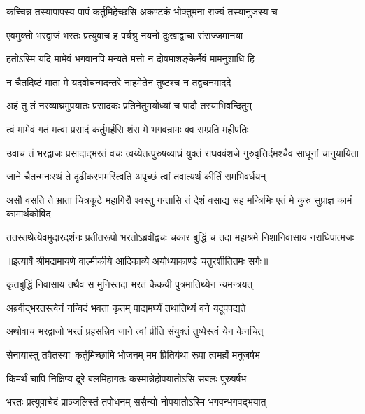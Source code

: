\twolineshloka
{कच्चिन्न तस्यापापस्य पापं कर्तुमिहेच्छसि}
{अकण्टकं भोक्तुमना राज्यं तस्यानुजस्य च} %

\twolineshloka
{एवमुक्तो भरद्वाजं भरतः प्रत्युवाच ह}
{पर्यश्रु नयनो दुःखाद्वाचा संसज्जमानया} %

\twolineshloka
{हतोऽस्मि यदि मामेवं भगवानपि मन्यते}
{मत्तो न दोषमाशङ्केर्नैवं मामनुशाधि हि} %

\twolineshloka
{न चैतदिष्टं माता मे यदवोचन्मदन्तरे}
{नाहमेतेन तुष्टश्च न तद्वचनमाददे} %

\twolineshloka
{अहं तु तं नरव्याघ्रमुपयातः प्रसादकः}
{प्रतिनेतुमयोध्यां च पादौ तस्याभिवन्दितुम्} %

\twolineshloka
{त्वं मामेवं गतं मत्वा प्रसादं कर्तुमर्हसि}
{शंस मे भगवन्रामः क्व सम्प्रति महीपतिः} %

\threelineshloka
{उवाच तं भरद्वाजः प्रसादाद्भरतं वचः}
{त्वय्येतत्पुरुषव्याघ्रं युक्तं राघववंशजे}
{गुरुवृत्तिर्दमश्चैव साधूनां चानुयायिता} %

\twolineshloka
{जाने चैतन्मनःस्थं ते दृढीकरणमस्त्विति}
{अपृच्छं त्वां तवात्यर्थं कीर्तिं समभिवर्धयन्} %

\threelineshloka
{असौ वसति ते भ्राता चित्रकूटे महागिरौ}
{श्वस्तु गन्तासि तं देशं वसाद्य सह मन्त्रिभिः}
{एतं मे कुरु सुप्राज्ञ कामं कामार्थकोविद} %

\fourlineindentedshloka
{ततस्तथेत्येवमुदारदर्शनः}
{प्रतीतरूपो भरतोऽब्रवीद्वचः}
{चकार बुद्धिं च तदा महाश्रमे}
{निशानिवासाय नराधिपात्मजः} %


{॥इत्यार्षे श्रीमद्रामायणे वाल्मीकीये आदिकाव्ये अयोध्याकाण्डे चतुरशीतितमः सर्गः॥}


\twolineshloka
{कृतबुद्धिं निवासाय तथैव स मुनिस्तदा}
{भरतं कैकयी पुत्रमातिथ्येन न्यमन्त्रयत्} %

\twolineshloka
{अब्रवीद्भरतस्त्वेनं नन्विदं भवता कृतम्}
{पाद्यमर्घ्यं तथातिथ्यं वने यदूपपद्यते} %

\twolineshloka
{अथोवाच भरद्वाजो भरतं प्रहसन्निव}
{जाने त्वां प्रीति संयुक्तं तुष्येस्त्वं येन केनचित्} %

\twolineshloka
{सेनायास्तु तवैतस्याः कर्तुमिच्छामि भोजनम्}
{मम प्रितिर्यथा रूपा त्वमर्हो मनुजर्षभ} %

\twolineshloka
{किमर्थं चापि निक्षिप्य दूरे बलमिहागतः}
{कस्मान्नेहोपयातोऽसि सबलः पुरुषर्षभ} %

\twolineshloka
{भरतः प्रत्युवाचेदं प्राञ्जलिस्तं तपोधनम्}
{ससैन्यो नोपयातोऽस्मि भगवन्भगवद्भयात्} %

